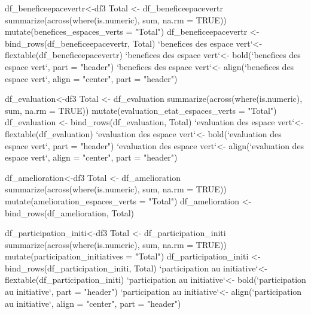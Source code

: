 df_beneficeepacevertr<-df3%
Total <- df_beneficeepacevertr %
  summarize(across(where(is.numeric), sum, na.rm = TRUE)) %
  mutate(benefices_espaces_verts = "Total")
df_beneficeepacevertr <- bind_rows(df_beneficeepacevertr, Total)
`benefices des espace vert`<- flextable(df_beneficeepacevertr)
`benefices des espace vert`<- bold(`benefices des espace vert`, part = "header")
`benefices des espace vert`<- align(`benefices des espace vert`, align = "center", part = "header")







df_evaluation<-df3%
Total <- df_evaluation %
  summarize(across(where(is.numeric), sum, na.rm = TRUE)) %
  mutate(evaluation_etat_espaces_verts = "Total")
df_evaluation <- bind_rows(df_evaluation, Total)
`evaluation des espace vert`<- flextable(df_evaluation)
`evaluation des espace vert`<- bold(`evaluation des espace vert`, part = "header")
`evaluation des espace vert`<- align(`evaluation des espace vert`, align = "center", part = "header")








df_amelioration<-df3%
Total <- df_amelioration %
  summarize(across(where(is.numeric), sum, na.rm = TRUE)) %
  mutate(amelioration_espaces_verts = "Total")
df_amelioration <- bind_rows(df_amelioration, Total)







df_participation_initi<-df3%
Total <- df_participation_initi %
  summarize(across(where(is.numeric), sum, na.rm = TRUE)) %
  mutate(participation_initiatives = "Total")
df_participation_initi <- bind_rows(df_participation_initi, Total)
`participation au initiative`<- flextable(df_participation_initi)
`participation au initiative`<- bold(`participation au initiative`, part = "header")
`participation au initiative`<- align(`participation au initiative`, align = "center", part = "header")







